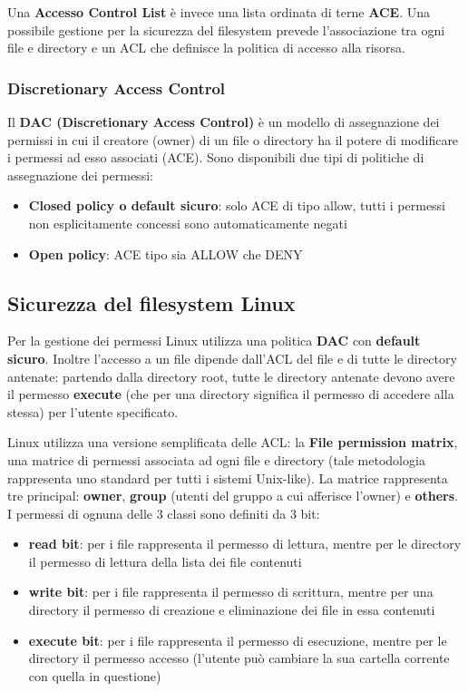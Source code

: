 Una \textbf{Accesso Control List} è invece una lista ordinata di terne \textbf{ACE}. Una possibile gestione per la sicurezza del filesystem prevede l'associazione tra ogni file e directory e un ACL
che definisce la politica di accesso alla risorsa.

\subsubsection{Discretionary Access Control}
Il \textbf{DAC (Discretionary Access Control)} è un modello di assegnazione dei permissi in cui il creatore (owner) di un file o directory ha il potere di modificare i permessi ad esso associati (ACE). Sono disponibili due tipi di politiche di assegnazione dei permessi:
\begin{itemize}
  \item \textbf{Closed policy o default sicuro}: solo ACE di tipo allow, tutti i permessi non esplicitamente concessi sono automaticamente negati
  \item \textbf{Open policy}: ACE tipo sia ALLOW che DENY
\end{itemize}

\subsection{Sicurezza del filesystem Linux}
Per la gestione dei permessi Linux utilizza una politica \textbf{DAC} con \textbf{default sicuro}. Inoltre l'accesso a un file dipende dall'ACL del file e di tutte le directory antenate: partendo dalla directory root, tutte le directory antenate devono avere il permesso \textbf{execute} (che per una directory significa il permesso di accedere alla stessa) per l'utente specificato. \newline \newline

Linux utilizza una versione semplificata delle ACL: la \textbf{File permission matrix}, una matrice di permessi associata ad ogni file e directory (tale metodologia rappresenta uno standard per tutti i sistemi Unix-like). La matrice rappresenta tre principal: \textbf{owner}, \textbf{group} (utenti del gruppo a cui afferisce l'owner) e \textbf{others}. I permessi di ognuna delle 3 classi sono definiti da 3 bit:
\begin{itemize}
  \item \textbf{read bit}: per i file rappresenta il permesso di lettura, mentre per le directory il permesso di lettura della lista dei file contenuti
  \item \textbf{write bit}: per i file rappresenta il permesso di scrittura, mentre per una directory il permesso di creazione e eliminazione dei file in essa contenuti
  \item \textbf{execute bit}: per i file rappresenta il permesso di esecuzione, mentre per le directory il permesso accesso (l'utente può cambiare la sua cartella corrente con quella in questione)
\end{itemize}

